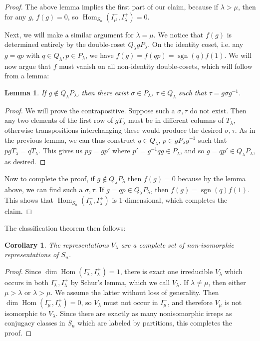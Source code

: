 \documentclass[11pt]{article}
\newtheorem{lem}{Lemma}
\newtheorem{cor}{Corollary}
\theoremstyle{definition}
\newcommand{\Hom}{\operatorname{Hom}}
\newcommand{\sgn}{\operatorname{sgn}}
\begin{document}
\begin{proof}
  The above lemma implies the first part of our claim, because if $\lambda >
  \mu$, then for any $g$, $f(g) = 0$, so $\Hom_{S_n}(I^-_\mu, I^+_\lambda) = 0$. 

  Next, we will make a similar argument for $\lambda = \mu$. We notice that
  $f(g)$ is determined entirely by the double-coset $Q_\lambda g 
  P_\lambda$. On the identity coset, i.e. any $g = qp$ with $q \in Q_\lambda,
  p\in P_\lambda$, we have $f(g) = f(qp) = \sgn(q)f(1)$. We will now argue that
  $f$ must vanish on all non-identity double-cosets, which will follow from a lemma:

  \begin{lem}
    If $g \not \in Q_\lambda P_\lambda$, then there exist $\sigma \in P_\lambda$,
    $\tau \in Q_\lambda$ such that $\tau = g \sigma g^{-1}$.
    \label{lem:same}
  \end{lem}

  \begin{proof}
    We will prove the contrapositive. Suppose such a $\sigma, \tau$ do not exist.
    Then any two elements of the first
    row of $gT_\lambda$ must be in different columns of $T_{\lambda}$, otherwise
    transpositions interchanging these would produce the desired $\sigma, \tau$.
    As in the previous lemma, we can thus construct $q \in Q_\lambda$, $p \in
    gP_\lambda g^{-1}$ such that $pgT_\lambda = qT_\lambda$. This gives us
    $pg = gp'$ where $p' = g^{-1}qg \in 
    P_\lambda$, and so $g = qp' \in Q_\lambda P_\lambda$, as desired.
  \end{proof}

  Now to complete the proof, if $g \notin Q_\lambda P_\lambda$ then $f(g) = 0$
  because by the lemma above, we can find such a $\sigma, \tau$. If $g = qp \in
  Q_\lambda P_\lambda$, then $f(g) = \sgn(q)f(1)$. This shows that
  $\Hom_{S_n}(I_\lambda^-, I_\lambda^+)$ is 1-dimensional, which completes the claim.

\end{proof}

The classification theorem then follows:
\begin{cor}
  The representations $V_\lambda$ are a complete set of non-isomorphic
  representations of $S_n$.
\end{cor}

\begin{proof}
Since $\dim \Hom(I^-_\lambda, I^+_\lambda) = 1$, there is exact one irreducible
$V_\lambda$ which occurs in both $I_\lambda^-, I_\lambda^+$ by Schur's lemma, which we call
$V_\lambda$. If $\lambda \neq \mu$, then either $\mu > \lambda$ or $\lambda >
\mu$. We assume the latter without loss of generality. Then $\dim \Hom(I^-_\mu,
I^+_\lambda) = 0$, so $V_\lambda$ must not occur in $I^-_\mu$, and therefore
$V_\mu$ is not isomorphic to $V_{\lambda}$. Since there are exactly as many
nonisomorphic irreps as conjugacy classes in $S_n$ which are labeled by
partitions, this completes the proof.
\end{proof}
\end{document}
